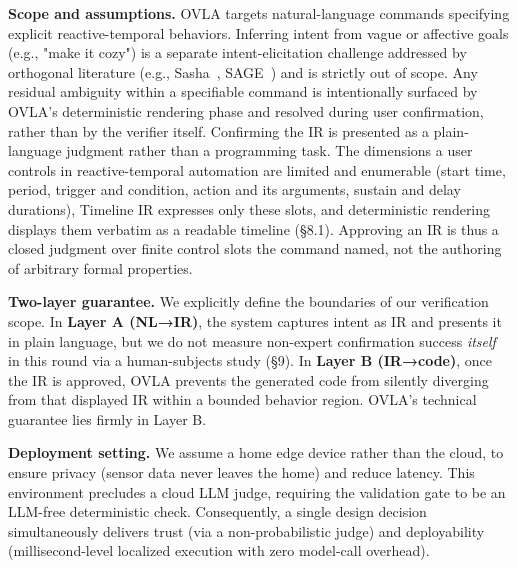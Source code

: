 \documentclass[sigconf,nonacm,anonymous,review]{acmart}
\begin{document}
\textbf{Scope and assumptions.} 
OVLA targets natural-language commands specifying explicit reactive-temporal behaviors. Inferring intent from vague or affective goals (e.g., "make it cozy") is a separate intent-elicitation challenge addressed by orthogonal literature (e.g., Sasha~\cite{sasha}, SAGE~\cite{sage}) and is strictly out of scope. Any residual ambiguity within a specifiable command is intentionally surfaced by OVLA's deterministic rendering phase and resolved during user confirmation, rather than by the verifier itself. 
Confirming the IR is presented as a plain-language judgment rather than a programming task. The dimensions a user controls in reactive-temporal automation are limited and enumerable (start time, period, trigger and condition, action and its arguments, sustain and delay durations), Timeline IR expresses only these slots, and deterministic rendering displays them verbatim as a readable timeline (\S8.1). Approving an IR is thus a closed judgment over finite control slots the command named, not the authoring of arbitrary formal properties.

\textbf{Two-layer guarantee.} We explicitly define the boundaries of our verification scope.
In \textbf{Layer A (NL→IR)}, the system captures intent as IR and presents it in plain language, but we do not measure non-expert confirmation success \emph{itself} in this round via a human-subjects study (\S9). In \textbf{Layer B (IR→code)}, once the IR is approved, OVLA prevents the generated code from silently diverging from that displayed IR within a bounded behavior region. OVLA's technical guarantee lies firmly in Layer B.

\textbf{Deployment setting.} We assume a home edge device rather than the cloud, to ensure privacy (sensor data never leaves the home) and reduce latency.
This environment precludes a cloud LLM judge, requiring the validation gate to be an LLM-free deterministic check. Consequently, a single design decision simultaneously delivers trust (via a non-probabilistic judge) and deployability (millisecond-level localized execution with zero model-call overhead).
\end{document}

